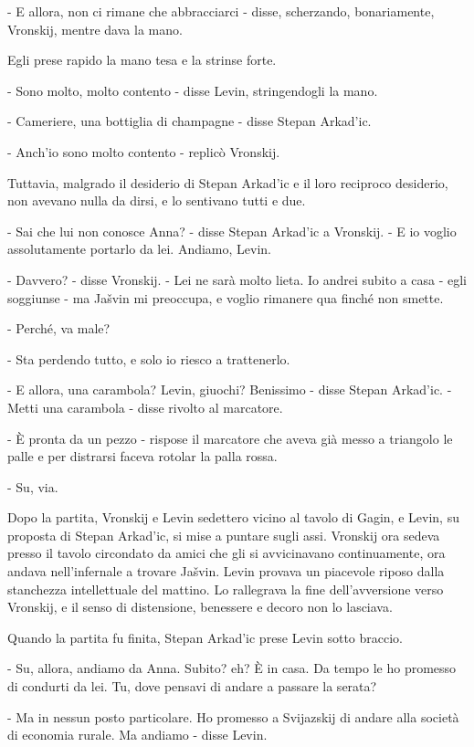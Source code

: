 - E allora, non ci rimane che abbracciarci - disse, scherzando, bonariamente, Vronskij, mentre dava la mano. 

Egli prese rapido la mano tesa e la strinse forte. 

- Sono molto, molto contento - disse Levin, stringendogli la mano. 

- Cameriere, una bottiglia di champagne - disse Stepan Arkad'ic. 

- Anch'io sono molto contento - replicò Vronskij. 

Tuttavia, malgrado il desiderio di Stepan Arkad'ic e il loro reciproco desiderio, non avevano nulla da dirsi, e lo sentivano tutti e due. 

- Sai che lui non conosce Anna? - disse Stepan Arkad'ic a Vronskij. - E io voglio assolutamente portarlo da lei. Andiamo, Levin. 

- Davvero? - disse Vronskij. - Lei ne sarà molto lieta. Io andrei subito a casa - egli soggiunse - ma Jašvin mi preoccupa, e voglio rimanere qua finché non smette. 

- Perché, va male? 

- Sta perdendo tutto, e solo io riesco a trattenerlo. 

- E allora, una carambola? Levin, giuochi? Benissimo - disse Stepan Arkad'ic. - Metti una carambola - disse rivolto al marcatore. 

- È pronta da un pezzo - rispose il marcatore che aveva già messo a triangolo le palle e per distrarsi faceva rotolar la palla rossa. 

- Su, via. 

Dopo la partita, Vronskij e Levin sedettero vicino al tavolo di Gagin, e Levin, su proposta di Stepan Arkad'ic, si mise a puntare sugli assi. Vronskij ora sedeva presso il tavolo circondato da amici che gli si avvicinavano continuamente, ora andava nell'infernale a trovare Jašvin. Levin provava un piacevole riposo dalla stanchezza intellettuale del mattino. Lo rallegrava la fine dell'avversione verso Vronskij, e il senso di distensione, benessere e decoro non lo lasciava. 

Quando la partita fu finita, Stepan Arkad'ic prese Levin sotto braccio. 

- Su, allora, andiamo da Anna. Subito? eh? È in casa. Da tempo le ho promesso di condurti da lei. Tu, dove pensavi di andare a passare la serata? 

- Ma in nessun posto particolare. Ho promesso a Svijazskij di andare alla società di economia rurale. Ma andiamo - disse Levin. 


